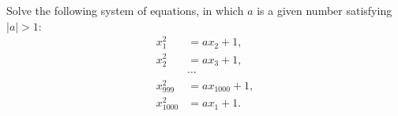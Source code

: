 Solve the following system of equations, in which $a$ is a given number satisfying $|a| > 1$:
\[ \begin{aligned} x_1^2 &= a x_2 + 1, \\ x_2^2 &= a x_3 + 1, \\ &\cdots \\ x_{999}^2 &= a x_{1000} + 1, \\ x_{1000}^2 &= a x_1 + 1. \end{aligned} \]
